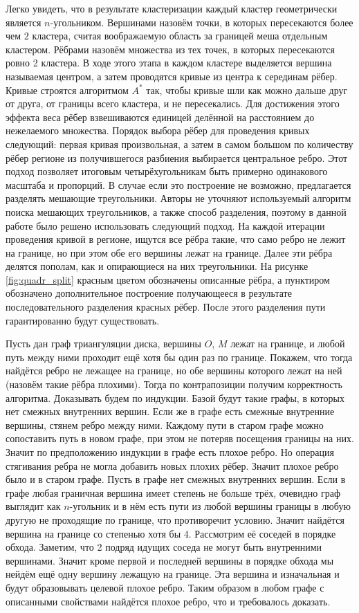 \documentclass[12pt]{extarticle}
\begin{document}
Легко увидеть, что в результате кластеризации каждый кластер геометрически является $n$-угольником. Вершинами назовём точки, в которых пересекаются более чем $2$ кластера, считая воображаемую область за границей меша отдельным кластером. Рёбрами назовём множества из тех точек, в которых пересекаются ровно 2 кластера. В ходе этого этапа в каждом кластере выделяется вершина называемая центром, а затем проводятся кривые из центра к серединам рёбер. Кривые строятся алгоритмом $A^*$ \cite{astar} так, чтобы кривые шли как можно дальше друг от друга, от границы всего кластера, и не пересекались. Для достижения этого эффекта веса рёбер взвешиваются единицей делённой на расстоянием до нежелаемого множества. Порядок выбора рёбер для проведения кривых следующий: первая кривая произвольная, а затем в самом большом по количеству рёбер регионе из получившегося разбиения выбирается центральное ребро. Этот подход позволяет итоговым четырёхугольникам быть примерно одинакового масштаба и пропорций. В случае если это построение не возможно, предлагается разделять мешающие треугольники. Авторы не уточняют используемый алгоритм поиска мешающих треугольников, а также способ разделения, поэтому в данной работе было решено использовать следующий подход. На каждой итерации проведения кривой в регионе, ищутся все рёбра такие, что само ребро не лежит на границе, но при этом обе его вершины лежат на границе. Далее эти рёбра делятся пополам, как и опирающиеся на них треугольники. На рисунке \ref{fig:quadr_split} красным цветом обозначены описанные рёбра, а пунктиром обозначено дополнительное построение получающееся в результате последовательного разделения красных рёбер. После этого разделения пути гарантированно будут существовать.

Пусть дан граф триангуляции диска, вершины $O$, $M$ лежат на границе, и любой путь между ними проходит ещё хотя бы один раз по границе. Покажем, что тогда найдётся ребро не лежащее на границе, но обе вершины которого лежат на ней (назовём такие рёбра плохими). Тогда по контрапозиции получим корректность алгоритма.
%
Доказывать будем по индукции. Базой будут такие графы, в которых нет смежных внутренних вершин. Если же в графе есть смежные внутренние вершины, стянем ребро между ними. Каждому пути в старом графе можно сопоставить путь в новом графе, при этом не потеряв посещения границы на них. Значит по предположению индукции в графе есть плохое ребро. Но операция стягивания ребра не могла добавить новых плохих рёбер. Значит плохое ребро было и в старом графе.
%
Пусть в графе нет смежных внутренних вершин. Если в графе любая граничная вершина имеет степень не больше трёх, очевидно граф выглядит как $n$-угольник и в нём есть пути из любой вершины границы в любую другую не проходящие по границе, что противоречит условию. Значит найдётся вершина на границе со степенью хотя бы 4. Рассмотрим её соседей в порядке обхода. Заметим, что 2 подряд идущих соседа не могут быть внутренними вершинами. Значит кроме первой и последней вершины в порядке обхода мы нейдём ещё одну вершину лежащую на границе. Эта вершина и изначальная и будут образовывать целевой плохое ребро.
%
Таким образом в любом графе с описанными свойствами найдётся плохое ребро, что и требовалось доказать.
\end{document}
